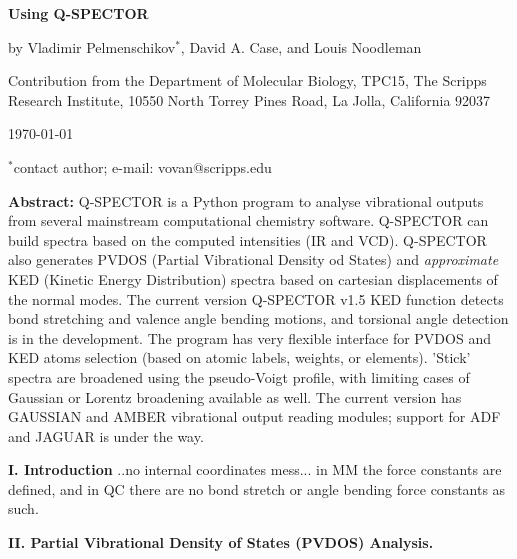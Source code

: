 \documentclass[10pt]{article}
\begin{document}
\baselineskip=20pt

\begin{center}
{\bf \huge Using \textsf{Q-SPECTOR}}
  
\vskip 30pt
 
\noindent
by Vladimir Pelmenschikov$^{*}$, David A. Case, and Louis Noodleman 
 
\vskip 10pt
 
\noindent
Contribution from the Department of Molecular Biology, TPC15, The
Scripps Research Institute, 10550 North Torrey Pines Road, La Jolla,
California 92037

\vskip 10pt

\today

\vskip 10pt

\end {center}

\noindent $^{*}$contact author; e-mail: vovan@scripps.edu

\vskip 30pt
 
\noindent
{\bf Abstract:} \textsf{Q-SPECTOR} is a Python program to analyse vibrational outputs from 
several mainstream computational chemistry software. \textsf{Q-SPECTOR} 
can build spectra based on the computed intensities (IR and VCD). \textsf{Q-SPECTOR} also generates 
PVDOS (Partial Vibrational Density od States) and {\it approximate} KED (Kinetic Energy Distribution) spectra based on 
cartesian displacements of the normal modes. The current version \textsf{Q-SPECTOR v1.5} KED function detects bond 
stretching and valence angle bending motions, and torsional angle detection is in the development. 
The program has very flexible interface for PVDOS and KED atoms selection (based on atomic labels, weights, or elements). 
'Stick' spectra are broadened using the pseudo-Voigt profile, 
with limiting cases of Gaussian or Lorentz broadening available as well. The current version has \textsf{GAUSSIAN} and 
\textsf{AMBER} vibrational output reading modules; support for \textsf{ADF} and \textsf{JAGUAR} is under the way. 

\newpage
 
\noindent
{\bf I. Introduction}
..no internal coordinates mess... in MM the force constants are defined, and in QC there are no bond stretch or angle bending 
force constants as such.

\vskip 30pt 

\noindent
{\bf II. Partial Vibrational Density of States (PVDOS) Analysis.}
\end{document}
